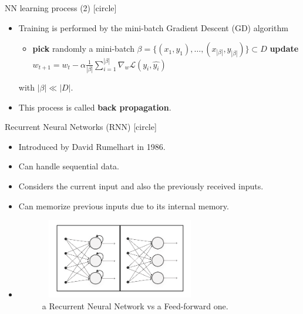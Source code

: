 \begin{frame}{NN learning process (2)}
    [circle]
    \begin{itemize}
        \item{Training is performed by the mini-batch Gradient Descent (GD) algorithm
        \begin{itemize}
            \item[]{
            \begin{algorithm}[H]
                \begin{algorithmic}[1]
                    \STATE \textbf{pick} randomly a mini-batch $\beta=\{(x_1,y_1),\dots,(x_{|\beta|},y_{|\beta|})\} \subset D$
                    \STATE \textbf{update} $w_{t+1}=w_t-\alpha\frac{1}{|\beta|}\sum_{i=1}^{|\beta|}\nabla_w\mathcal{L}(y_i,\hat{y_i})$
                    \ENDWHILE
                \end{algorithmic}
                \label{alg:gd}
            \end{algorithm}
            }
        \end{itemize}
        with $|\beta| \ll |D|$.
        }
        \vspace{0.3cm}
        \item{This process is called \textbf{back propagation}.}
    \end{itemize}
\end{frame}

\begin{frame}{Recurrent Neural Networks (RNN)}
    [circle]
    \begin{itemize}
        \item{Introduced by David Rumelhart in 1986.}
        \vspace{0.2cm}
        \item{Can handle sequential data.}
        \vspace{0.2cm}
        \item{Considers the current input and also the previously received inputs.}
        \vspace{0.2cm}
        \item{Can memorize previous inputs due to its internal memory.}
        \vspace{0.2cm}
        \item[]{
        \begin{figure}[H]
            \centering
            \includegraphics[width=7cm,height=3.5cm]{images/rnn-vs-fnn.png}
            \caption{a Recurrent Neural Network vs a Feed-forward one.}
            \label{fig:rnn-vs-fnn}
        \end{figure}
        }
    \end{itemize}
\end{frame}

